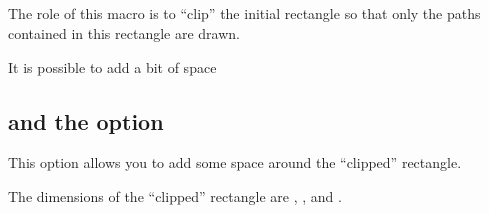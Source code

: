 \subsection{}

The role of this macro is to \enquote{clip} the initial rectangle so that only the paths
contained in this rectangle are drawn.

\begin{tkzexample}[latex=8cm,small]
\end{tkzexample}

It is possible to add a bit of space

\vspace*{-10pt}

\begin{tkzltxexample}[]
  \tkzClip[space=1]
\end{tkzltxexample}

\subsection{ and the option }

This option allows you to add some space around the \enquote{clipped} rectangle.

\begin{tkzexample}[latex=8cm,small]
\end{tkzexample}

The dimensions of the \enquote{clipped} rectangle are ,
,  and .

\endinput
